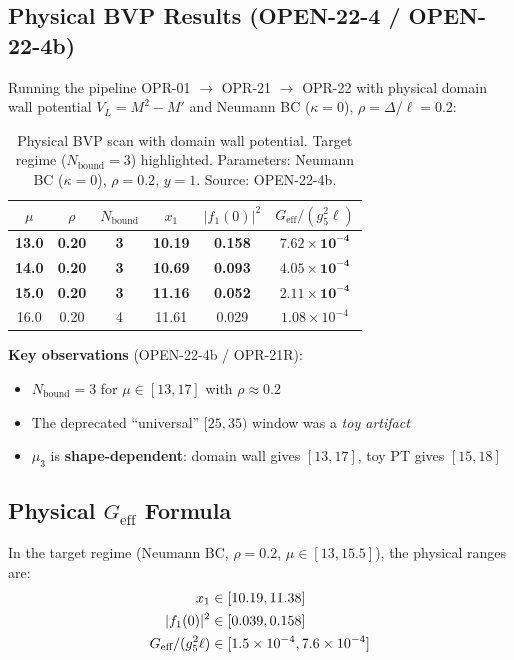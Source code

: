 \subsection{Physical BVP Results (OPEN-22-4 / OPEN-22-4b)}
\label{sec:ch19_physical_results}

Running the pipeline OPR-01 $\to$ OPR-21 $\to$ OPR-22 with physical domain wall
potential $V_L = M^2 - M'$ \tagDc{} and Neumann BC ($\kappa = 0$), $\rho = \Delta/\ell = 0.2$:

\begin{table}[h]
\centering
\begin{tabular}{|c|c|c|c|c|c|}
\hline
$\mu$ & $\rho$ & $N_{\text{bound}}$ & $x_1$ & $|f_1(0)|^2$ & $G_{\text{eff}}/(g_5^2\ell)$ \\
\hline
\textbf{13.0} & \textbf{0.20} & \textbf{3} & \textbf{10.19} & \textbf{0.158} & $\mathbf{7.62 \times 10^{-4}}$ \\
\textbf{14.0} & \textbf{0.20} & \textbf{3} & \textbf{10.69} & \textbf{0.093} & $\mathbf{4.05 \times 10^{-4}}$ \\
\textbf{15.0} & \textbf{0.20} & \textbf{3} & \textbf{11.16} & \textbf{0.052} & $\mathbf{2.11 \times 10^{-4}}$ \\
16.0 & 0.20 & 4 & 11.61 & 0.029 & $1.08 \times 10^{-4}$ \\
\hline
\end{tabular}
\caption{Physical BVP scan with domain wall potential. Target regime ($N_{\text{bound}}=3$)
    highlighted. Parameters: Neumann BC ($\kappa=0$), $\rho=0.2$, $y=1$. Source: OPEN-22-4b.}
\label{tab:ch19_physical_scan}
\end{table}

\textbf{Key observations} (OPEN-22-4b / OPR-21R):
\begin{itemize}[nosep]
    \item $N_{\text{bound}} = 3$ for $\mu \in [13, 17]$ with $\rho \approx 0.2$
    \item The deprecated ``universal'' $[25, 35)$ window was a \emph{toy artifact}
    \item $\mu_3$ is \textbf{shape-dependent}: domain wall gives $[13, 17]$, toy PT gives $[15, 18]$
\end{itemize}

\subsection{Physical $G_{\text{eff}}$ Formula}
\label{sec:ch19_geff_physical}

In the target regime (Neumann BC, $\rho = 0.2$, $\mu \in [13, 15.5]$), the physical ranges are:
\begin{align}
    x_1 &\in [10.19, 11.38] \notag \\
    |f_1(0)|^2 &\in [0.039, 0.158] \notag \\
    G_{\text{eff}}/(g_5^2 \ell) &\in [1.5 \times 10^{-4}, 7.6 \times 10^{-4}]
    \label{eq:ch19_geff_physical}
\end{align}

